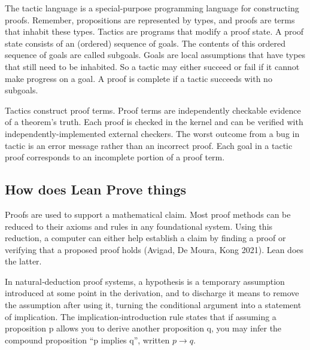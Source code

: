 \documentclass{article}
\newcommand{\1}{\mathbbm{1}}
\theoremstyle{plain}
\theoremstyle{definition}
\numberwithin{equation}{section}
\begin{document}
The tactic language is a special-purpose programming language for constructing proofs. Remember, propositions are represented by types, and proofs are terms that inhabit these types. Tactics are programs that modify a proof state. A proof state consists of an (ordered) sequence of goals. The contents of this ordered sequence of goals are called subgoals. Goals are local assumptions that have types that still need to be inhabited. So a tactic may either succeed or fail if it cannot make progress on a goal. A proof is complete if a tactic succeeds with no subgoals.  

Tactics construct proof terms. Proof terms are independently checkable evidence of a theorem’s truth. Each proof is checked in the kernel and can be verified with independently-implemented external checkers. The worst outcome from a bug in tactic is an error message rather than an incorrect proof. Each goal in a tactic proof corresponds to an incomplete portion of a proof term. 

\subsection{How does Lean Prove things}

Proofs are used to support a mathematical claim. Most proof methods can be reduced to their axioms and rules in any foundational system. Using this reduction, a computer can either help establish a claim by finding a proof or verifying that a proposed proof holds (Avigad, De Moura,  Kong 2021). Lean does the latter. 

In natural‑deduction proof systems, a hypothesis is a temporary assumption introduced at some point in the derivation, and to discharge it means to remove the assumption after using it, turning the conditional argument into a statement of implication. The implication‑introduction rule states that if assuming a proposition p allows you to derive another proposition q, you may infer the compound proposition “p implies q”, written $p\rightarrow q$. 
\end{document}
